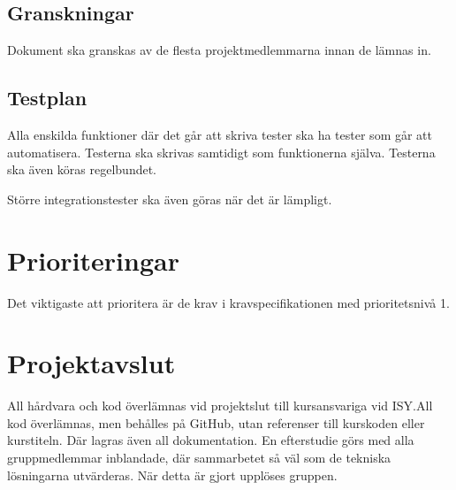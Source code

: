 \documentclass[a4paper,titlepage,12pt]{article}
\begin{document}
	\subsection{Granskningar}
	Dokument ska granskas av de flesta projektmedlemmarna innan de lämnas in.
	
	\subsection{Testplan}
	Alla enskilda funktioner där det går att skriva tester ska ha tester som går att
	automatisera. Testerna ska skrivas samtidigt som funktionerna själva. Testerna ska
	även köras regelbundet. 

	Större integrationstester ska även göras när det är lämpligt.
	
	\section{Prioriteringar}
    Det viktigaste att prioritera är de krav i kravspecifikationen med
    prioritetsnivå 1.
	
	
	\section{Projektavslut}
	All hårdvara och kod överlämnas vid projektslut till kursansvariga vid
    ISY.\@ All kod överlämnas, men behålles på GitHub, utan referenser till
    kurskoden eller kurstiteln. Där lagras även all dokumentation. En
    efterstudie görs med alla gruppmedlemmar inblandade, där sammarbetet så väl
    som de tekniska lösningarna utvärderas. När detta är gjort upplöses gruppen.
\end{document}
